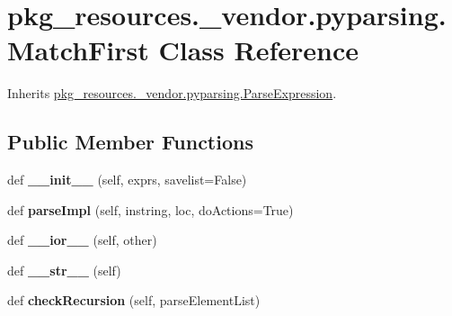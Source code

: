 \hypertarget{classpkg__resources_1_1__vendor_1_1pyparsing_1_1_match_first}{}\section{pkg\+\_\+resources.\+\_\+vendor.\+pyparsing.\+Match\+First Class Reference}
\label{classpkg__resources_1_1__vendor_1_1pyparsing_1_1_match_first}


Inherits \hyperlink{classpkg__resources_1_1__vendor_1_1pyparsing_1_1_parse_expression}{pkg\+\_\+resources.\+\_\+vendor.\+pyparsing.\+Parse\+Expression}.

\subsection*{Public Member Functions}
\begin{DoxyCompactItemize}
\item 
\mbox{\label{classpkg__resources_1_1__vendor_1_1pyparsing_1_1_match_first_acc3d30ea535be38efbcf99066d89209c}} 
def {\bfseries \+\_\+\+\_\+init\+\_\+\+\_\+} (self, exprs, savelist=False)
\item 
\mbox{\label{classpkg__resources_1_1__vendor_1_1pyparsing_1_1_match_first_ae9b2ce37fba253237d80615c98f71b5f}} 
def {\bfseries parse\+Impl} (self, instring, loc, do\+Actions=True)
\item 
\mbox{\label{classpkg__resources_1_1__vendor_1_1pyparsing_1_1_match_first_a685ce1ceb8cb54316cced1e61638a85b}} 
def {\bfseries \+\_\+\+\_\+ior\+\_\+\+\_\+} (self, other)
\item 
\mbox{\label{classpkg__resources_1_1__vendor_1_1pyparsing_1_1_match_first_a2de89959b1bde892b75753caad1789ee}} 
def {\bfseries \+\_\+\+\_\+str\+\_\+\+\_\+} (self)
\item 
\mbox{\label{classpkg__resources_1_1__vendor_1_1pyparsing_1_1_match_first_addab39b620dc0ddd580d497248827dd3}} 
def {\bfseries check\+Recursion} (self, parse\+Element\+List)
\end{DoxyCompactItemize}
